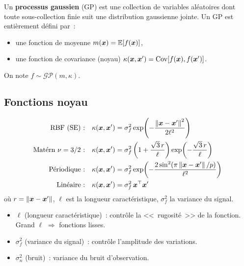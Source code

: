 \begin{definition}
Un \textbf{processus gaussien} (GP) est une collection de variables al\'eatoires
dont toute sous-collection finie suit une distribution gaussienne jointe.
Un GP est enti\`erement d\'efini par~:
\begin{itemize}
  \item une fonction de moyenne $m(\bm{x}) = \mathbb{E}[f(\bm{x})]$,
  \item une fonction de covariance (noyau)
    $\kappa(\bm{x}, \bm{x}') = \mathrm{Cov}[f(\bm{x}), f(\bm{x}')]$.
\end{itemize}
On note $f \sim \mathcal{GP}(m, \kappa)$.
\end{definition}

\subsection{Fonctions noyau}

\begin{formules}[title=\textbf{Noyaux courants}]
\begin{align}
  \text{RBF (SE)~:} \quad & \kappa(\bm{x}, \bm{x}') = \sigma_f^2
  \exp\!\left(-\frac{\left\| \bm{x} - \bm{x}' \right\|^2}{2\ell^2}\right)
  \label{eq:rbf} \\
  \text{Mat\'ern $\nu = 3/2$~:} \quad & \kappa(\bm{x}, \bm{x}') =
  \sigma_f^2 \left(1 + \frac{\sqrt{3}\,r}{\ell}\right)
  \exp\!\left(-\frac{\sqrt{3}\,r}{\ell}\right)
  \label{eq:matern32} \\
  \text{P\'eriodique~:} \quad & \kappa(\bm{x}, \bm{x}') = \sigma_f^2
  \exp\!\left(-\frac{2\sin^2(\pi\left\| \bm{x}-\bm{x}' \right\|/p)}{\ell^2}\right)
  \label{eq:periodic} \\
  \text{Lin\'eaire~:} \quad & \kappa(\bm{x}, \bm{x}') = \sigma_f^2\,
  \bm{x}^\top \bm{x}'
  \label{eq:linear}
\end{align}
o\`u $r = \left\| \bm{x} - \bm{x}' \right\|$, $\ell$ est la longueur
caract\'eristique, $\sigma_f^2$ la variance du signal.
\end{formules}

\begin{intuition}[title=\textbf{R\^ole des hyperparam\`etres}]
\begin{itemize}
  \item $\ell$ (longueur caract\'eristique)~: contr\^ole la <<~rugosit\'e~>>
    de la fonction. Grand $\ell$ $\Rightarrow$ fonctions lisses.
  \item $\sigma_f^2$ (variance du signal)~: contr\^ole l'amplitude des
    variations.
  \item $\sigma_n^2$ (bruit)~: variance du bruit d'observation.
\end{itemize}
\end{intuition}

